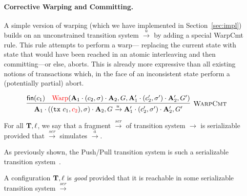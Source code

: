 
\paragraph{Corrective Warping and Committing.}
A simple version of warping (which we have implemented in
Section~\ref{sec:impl}) builds on an unconstrained transition system
$\xrightarrow{u}$ by adding a special {\sc WarpCmt} rule. This rule
attempts to perform a warp---
replacing the current state with state that would have been reached in
an atomic interleaving and then committing---or else, aborts. This is
already more expressive than all existing notions of transactions
which, in the face of an inconsistent state perform a (potentially
partial) abort.


$$
\infer[\text{\sc WarpCmt}]{ 
  \As_1 \cdot ((\tx{c_1},\red{c_2}),\sigma) \cdot \As_2, G  \xrightarrow{u}
  \As'_1 \cdot (c'_2,\sigma') \cdot \As'_2, G'
}{
  \nothing{c_1} &
   \text{\red{Warp}}(  \As_1 \cdot (c_2,\sigma) \cdot \As_2, G,
  \As'_1 \cdot (c'_2,\sigma') \cdot \As'_2, G')
}
$$





\bigskip
\bigskip
\bigskip
\bigskip
\bigskip
\bigskip
\bigskip
\bigskip


\begin{definition}
For all $\mathbf{T},\ell$, we say that a fragment 
$\xrightarrow{ser}$ of transition system $\xrightarrow{}$ is
serializable provided that 
$\xrightarrow{ser}$ simulates $\xrightarrow{a}$.
\end{definition}


As previously shown, the Push/Pull transition system is such a
serializable transition system~\cite{PMPY}.

\begin{definition}
A configuration $\mathbf{T},\ell$ is \emph{good} provided that it is reachable in
some serializable transition system $\xrightarrow{ser}$
\end{definition}


